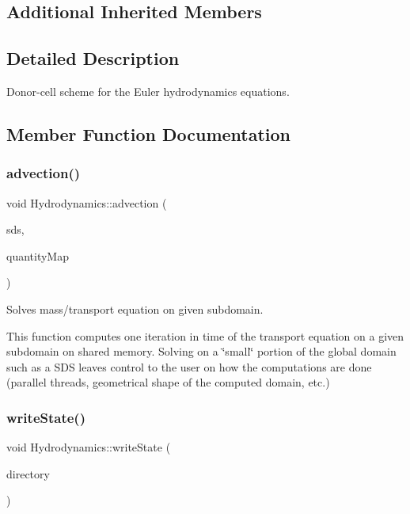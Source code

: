 \subsection*{Additional Inherited Members}


\subsection{Detailed Description}
Donor-\/cell scheme for the Euler hydrodynamics equations. 

\subsection{Member Function Documentation}
\mbox{\label{classHydrodynamics_a7d465b65ae01b26029a173af8e7b8f73}} 
\subsubsection{\texorpdfstring{advection()}{advection()}}
{\footnotesize\ttfamily void Hydrodynamics\+::advection (\begin{DoxyParamCaption}\item[{const \hyperlink{classSDShared}{S\+D\+Shared} \&}]{sds,  }\item[{std\+::map$<$ std\+::string, \hyperlink{classQuantity}{Quantity}$<$ real $>$ $\ast$ $>$}]{quantity\+Map }\end{DoxyParamCaption})}



Solves mass/transport equation on given subdomain. 

This function computes one iteration in time of the transport equation on a given subdomain on shared memory. Solving on a \char`\"{}small\char`\"{} portion of the global domain such as a S\+DS leaves control to the user on how the computations are done (parallel threads, geometrical shape of the computed domain, etc.) \mbox{\label{classHydrodynamics_a3c0d39e9aff57c14ae919f7cbc6a2881}} 
\subsubsection{\texorpdfstring{write\+State()}{writeState()}\hspace{0.1cm}{\footnotesize\ttfamily [1/2]}}
{\footnotesize\ttfamily void Hydrodynamics\+::write\+State (\begin{DoxyParamCaption}\item[{std\+::string}]{directory }\end{DoxyParamCaption})}



